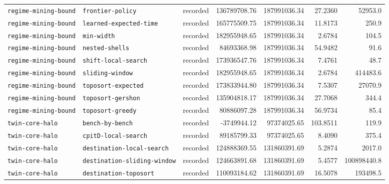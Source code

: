 \begin{longtable}{>{\raggedright\arraybackslash}p{}>{\raggedright\arraybackslash}p{}r r r r r}
\texttt{regime\allowbreak-mining\allowbreak-bound} & \texttt{frontier\allowbreak-policy} & recorded & 136789708.76 & 187991036.34 & 27.2360 & 52953.0 \\
\texttt{regime\allowbreak-mining\allowbreak-bound} & \texttt{learned\allowbreak-expected\allowbreak-time} & recorded & 165775509.75 & 187991036.34 & 11.8173 & 250.9 \\
\texttt{regime\allowbreak-mining\allowbreak-bound} & \texttt{min\allowbreak-width} & recorded & 182955948.65 & 187991036.34 & 2.6784 & 104.5 \\
\texttt{regime\allowbreak-mining\allowbreak-bound} & \texttt{nested\allowbreak-shells} & recorded & 84693368.98 & 187991036.34 & 54.9482 & 91.6 \\
\texttt{regime\allowbreak-mining\allowbreak-bound} & \texttt{shift\allowbreak-local\allowbreak-search} & recorded & 173936547.76 & 187991036.34 & 7.4761 & 48.7 \\
\texttt{regime\allowbreak-mining\allowbreak-bound} & \texttt{sliding\allowbreak-window} & recorded & 182955948.65 & 187991036.34 & 2.6784 & 414483.6 \\
\texttt{regime\allowbreak-mining\allowbreak-bound} & \texttt{toposort\allowbreak-expected} & recorded & 173833944.80 & 187991036.34 & 7.5307 & 27070.9 \\
\texttt{regime\allowbreak-mining\allowbreak-bound} & \texttt{toposort\allowbreak-gershon} & recorded & 135904818.17 & 187991036.34 & 27.7068 & 344.4 \\
\texttt{regime\allowbreak-mining\allowbreak-bound} & \texttt{toposort\allowbreak-greedy} & recorded & 80886097.28 & 187991036.34 & 56.9734 & 85.4 \\
\texttt{twin\allowbreak-core\allowbreak-halo} & \texttt{bench\allowbreak-by\allowbreak-bench} & recorded & -3749944.12 & 97374025.65 & 103.8511 & 119.9 \\
\texttt{twin\allowbreak-core\allowbreak-halo} & \texttt{cpitD\allowbreak-local\allowbreak-search} & recorded & 89185799.33 & 97374025.65 & 8.4090 & 375.4 \\
\texttt{twin\allowbreak-core\allowbreak-halo} & \texttt{destination\allowbreak-local\allowbreak-search} & recorded & 124888369.55 & 131860391.69 & 5.2874 & 2017.0 \\
\texttt{twin\allowbreak-core\allowbreak-halo} & \texttt{destination\allowbreak-sliding\allowbreak-window} & recorded & 124663891.68 & 131860391.69 & 5.4577 & 100898440.8 \\
\texttt{twin\allowbreak-core\allowbreak-halo} & \texttt{destination\allowbreak-toposort} & recorded & 110093184.62 & 131860391.69 & 16.5078 & 193498.5 \\

\end{longtable}
